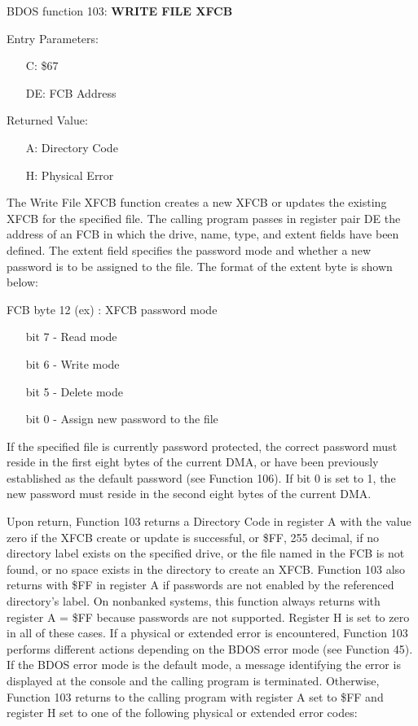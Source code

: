 BDOS function 103: \textbf{WRITE FILE XFCB}

Entry Parameters:
\begin{itemize}
\item[] C: \$67
\item[] DE: FCB Address
\end{itemize}

Returned Value:
\begin{itemize}
\item[] A: Directory Code
\item[] H: Physical Error
\end{itemize}

The Write File XFCB function creates a new XFCB or updates the
existing XFCB for the specified file. The calling program passes in
register pair DE the address of an FCB in which the drive, name, type,
and extent fields have been defined. The extent field specifies the
password mode and whether a new password is to be assigned to the
file. The format of the extent byte is shown below:

FCB byte 12 (ex) : XFCB password mode
\begin{itemize}
\item[bit] 7 - Read mode
\item[bit] 6 - Write mode
\item[bit] 5 - Delete mode
\item[bit] 0 - Assign new password to the file
\end{itemize}

If the specified file is currently password protected, the correct
password must reside in the first eight bytes of the current DMA, or
have been previously established as the default password (see Function
106). If bit 0 is set to 1, the new password must reside in the second
eight bytes of the current DMA.

Upon return, Function 103 returns a Directory Code in register A with
the value zero if the XFCB create or update is successful, or \$FF,
255 decimal, if no directory label exists on the specified drive, or
the file named in the FCB is not found, or no space exists in the
directory to create an XFCB. Function 103 also returns with \$FF in
register A if passwords are not enabled by the referenced directory's
label. On nonbanked systems, this function always returns with
register A = \$FF because passwords are not supported. Register H is
set to zero in all of these cases. If a physical or extended error is
encountered, Function 103 performs different actions depending on the
BDOS error mode (see Function 45). If the BDOS error mode is the
default mode, a message identifying the error is displayed at the
console and the calling program is terminated. Otherwise, Function 103
returns to the calling program with register A set to \$FF and
register H set to one of the following physical or extended error
codes:

